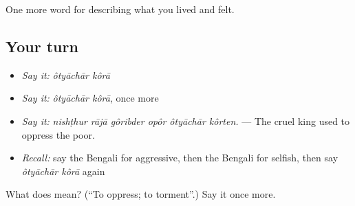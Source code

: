 \begin{grammarlens}[title={What you've built}]
One more word for describing what you lived and felt.
\end{grammarlens}

\subsection*{Your turn}
\begin{itemize}
\raggedright
  \item \emph{Say it:} \emph{ôtyāchār kôrā}
  \item \emph{Say it:} \emph{ôtyāchār kôrā}, once more
  \item \emph{Say it:} \emph{nishṭhur rājā gôribder opôr ôtyāchār kôrten.} — The cruel king used to oppress the poor.
  \item \emph{Recall:} say the Bengali for aggressive, then the Bengali for selfish, then say \emph{ôtyāchār kôrā} again
\end{itemize}

\begin{tcolorbox}[breakable,colback=teal!4,colframe=teal!35!black,title={Before you move on}]
What does   mean? (\textquotedblleft{}To oppress; to torment\textquotedblright{}.) Say it once more.
\end{tcolorbox}
